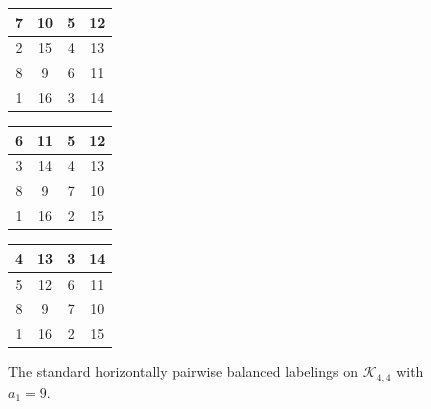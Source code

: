 \documentclass[10pt, reqno]{amsart}
\theoremstyle{definition}
\theoremstyle{plain}
\begin{document}
\begin{figure}[hbt!]
    \centering
    \begin{tabular}{|c|c|c|c|}\hline
        7  &10  &5   &12  \\  \hline
        2  &15   &4   &13  \\  \hline
        8  &9   &6   &11  \\  \hline
        1  &16  &3   &14  \\  \hline
    \end{tabular}
\hspace{0.15in}\begin{tabular}{|c|c|c|c|} \hline
        6  &11  &5   &12  \\  \hline
        3  &14   &4   &13  \\  \hline
        8  &9   &7   &10  \\  \hline
        1  &16  &2   &15  \\  \hline
    \end{tabular}
 \hspace{0.15in}   \begin{tabular}{|c|c|c|c|} \hline
        4  &13  &3  &14  \\  \hline
        5  &12   &6   &11  \\  \hline
        8  &9   &7   &10  \\  \hline
        1  &16  &2   &15  \\  \hline
    \end{tabular}
    \caption{The standard horizontally pairwise balanced labelings on
    $\mathcal{K}_{4,4}$ with $a_1=9$.}
    \label{fig:StandHorzLabelsA1=9}
\end{figure}
\end{document}
